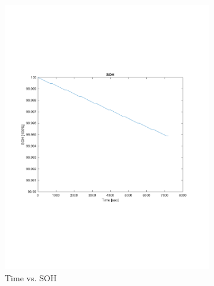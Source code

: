 \documentclass[10pt]{article}
\begin{document}
\begin{figure}[H]
\begin{subfigure}[t]{0.36\textwidth}
		\includegraphics[width=\textwidth]{SOH.pdf}
		\caption{Time vs. SOH}
		\label{fig:SOH}
	\end{subfigure}
	\begin{subfigure}[t]{0.36\textwidth}

\end{subfigure}
\end{figure}
\end{document}
